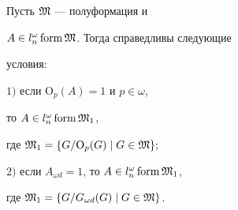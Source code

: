 \begin{lem}


Пусть $\frak{M}$ ---  полуформация и


$A\in l_n^{\omega}\operatorname{form} \frak{M}$. Тогда справедливы следующие


условия\/$:$





$1)$ если $\mathrm O_p(A)=1$ и $p\in\omega$,


то $A\in l_n^{\omega}\operatorname{form} \frak{M}_1$,


где $\frak{M}_1=\{G/{\mathrm O}_p(G)\mid G\in\frak{M}\};$





$2)$ если $A_{\omega d}=1$, то $A\in l_n^{\omega}\operatorname{form} \frak{M}_1$,


где $\frak{M}_1=\{G/G_{\omega d}(G)\mid G\in\frak{M}\}$.


\end{lem}





